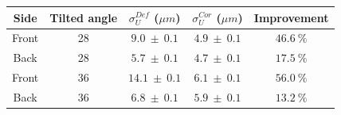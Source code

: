       \begin{table}[!h]
        \centering
        \begin{tabular}{c c c c c}
          \hline %
          Side &  Tilted angle  &   $\sigma_{U}^{Def}$ ($\mu m$) &   $\sigma_{U}^{Cor}$ ($\mu m$) & Improvement \\
          \hline %
          \hline %
          Front &      28       & $ 9.0 \ \pm \ 0.1 $ & $ 4.9 \ \pm \ 0.1 $ &    $46.6 \ \%$  \tabularnewline
          Back  &      28       & $ 5.7 \ \pm \ 0.1 $ & $ 4.7 \ \pm \ 0.1 $ &    $17.5 \ \%$  \tabularnewline
          \hline %
          Front &      36       & $ 14.1 \ \pm \ 0.1 $ & $ 6.1 \ \pm \ 0.1 $ &    $56.0 \ \%$ \tabularnewline
          Back  &      36       & $ 6.8 \ \pm \ 0.1 $ & $ 5.9 \ \pm \ 0.1 $ &    $13.2 \ \%$  \tabularnewline

\end{tabular}
\end{table}
